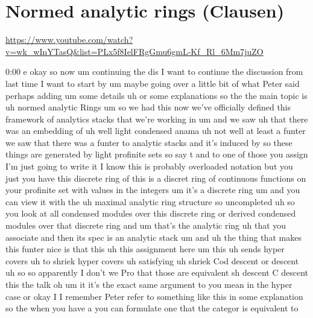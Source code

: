 
\section{\ufs Normed analytic rings (Clausen)}

\url{https://www.youtube.com/watch?v=wk_wInYTasQ&list=PLx5f8IelFRgGmu6gmL-Kf_Rl_6Mm7juZO}
\renewcommand{\yt}[2]{\href{https://www.youtube.com/watch?v=wk_wInYTasQ&list=PLx5f8IelFRgGmu6gmL-Kf_Rl_6Mm7juZO&t=#1}{#2}}
\vspace{1em}

\begin{unfinished}{0:00}
  e
okay  so  now  um  continuing  the  dis  I  want
to  continue  the  discussion  from  last
time  I  want  to  start  by  um  maybe  going
over  a  little  bit  of  what  Peter  said
perhaps  adding  um  some  details  uh  or
some  explanations  so  the  the  main  topic
is  uh  normed  analytic
Rings  um  so  we  had  this  now  we've
officially  defined  this  framework  of
analytics  stacks  that  we're  working  in
um  and  we  saw  uh  that  there  was  an
embedding
of  uh  well  light  condensed  anama  uh  not
well  at  least  a  funter  we  saw  that  there
was  a  funter  to  analytic
stacks  and  it's  induced
by  so  these  things  are  generated  by
light  profinite  sets  so  say
t
and  to  one  of  those  you  assign  I'm  just
going  to  write  it  I  know  this  is
probably  overloaded  notation  but  you
just  you  have  this  discrete  ring
of  this  is  a  discret
ring  of  continuous  functions  on  your
profinite  set  with  values  in  the
integers  um  it's  a  discrete  ring  um  and
you  can  view  it  with  the  uh  maximal
analytic  ring  structure  so  uncompleted
uh  so  you  look  at  all  condensed  modules
over  this  discrete  ring  or  derived
condensed  modules  over  that  discrete
ring  and  um  that's  the  analytic  ring  uh
that  you  associate  and  then  its  spec  is
an  analytic
stack  um  and  uh  the  thing  that  makes
this  funter  nice  is  that  this  uh  this
assignment  here
um  this  uh  sends  hyper
covers  uh  to  shriek  hyper
covers  uh
satisfying  uh  shriek  Cod  descent  or
descent  uh  so  so  apparently  I  don't  we
Pro  that  those  are  equivalent  sh  descent
C  descent  this  the  talk  oh  um  it  it's
the  exact  same  argument  to  you  mean  in
the  hyper  case
or  okay  I  I  remember  Peter  refer  to
something  like  this  in  some  explanation
so  the  when  you  have  a  you  can  formulate
one  that  the  categor  is  equivalent  to

\end{unfinished}
